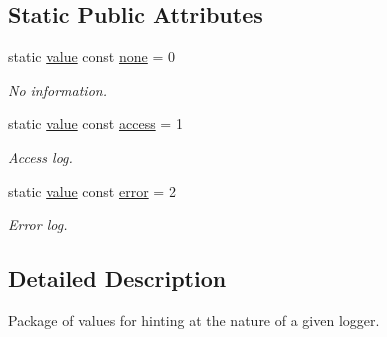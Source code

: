 \subsection*{Static Public Attributes}
\begin{DoxyCompactItemize}
\item 
static \hyperlink{structwebsocketpp_1_1log_1_1channel__type__hint_ad12a7f6555b71aabdc4cbec604dc89dd}{value} const \hyperlink{structwebsocketpp_1_1log_1_1channel__type__hint_a2e7de3c97193085a20b7bb42815d23e2}{none} = 0\hypertarget{structwebsocketpp_1_1log_1_1channel__type__hint_a2e7de3c97193085a20b7bb42815d23e2}{}\label{structwebsocketpp_1_1log_1_1channel__type__hint_a2e7de3c97193085a20b7bb42815d23e2}

\begin{DoxyCompactList}\small\item\em No information. \end{DoxyCompactList}\item 
static \hyperlink{structwebsocketpp_1_1log_1_1channel__type__hint_ad12a7f6555b71aabdc4cbec604dc89dd}{value} const \hyperlink{structwebsocketpp_1_1log_1_1channel__type__hint_a8c38587fffbffbfcfc35577734b0d653}{access} = 1\hypertarget{structwebsocketpp_1_1log_1_1channel__type__hint_a8c38587fffbffbfcfc35577734b0d653}{}\label{structwebsocketpp_1_1log_1_1channel__type__hint_a8c38587fffbffbfcfc35577734b0d653}

\begin{DoxyCompactList}\small\item\em Access log. \end{DoxyCompactList}\item 
static \hyperlink{structwebsocketpp_1_1log_1_1channel__type__hint_ad12a7f6555b71aabdc4cbec604dc89dd}{value} const \hyperlink{structwebsocketpp_1_1log_1_1channel__type__hint_a91473ac49fba696549da438483a6fe31}{error} = 2\hypertarget{structwebsocketpp_1_1log_1_1channel__type__hint_a91473ac49fba696549da438483a6fe31}{}\label{structwebsocketpp_1_1log_1_1channel__type__hint_a91473ac49fba696549da438483a6fe31}

\begin{DoxyCompactList}\small\item\em Error log. \end{DoxyCompactList}\end{DoxyCompactItemize}


\subsection{Detailed Description}
Package of values for hinting at the nature of a given logger. 

